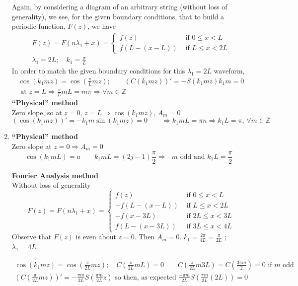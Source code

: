 \documentclass[twoside,10pt]{amsart}
\begin{document}
\begin{enumerate}
Again, by considering a diagram of an arbitrary string (without loss of generality), we see, for the given boundary conditions, that to build a periodic function, $F(z)$, we have
\[
\begin{gathered}
F(z) = F(n\lambda_1 + x) = \begin{cases} f(z) & \text{ if } 0 \leq x < L \\
  f(L- (x-L)) & \text{ if } L \leq x < 2 L 
\end{cases}  \\
\lambda_1 = 2L; \quad  k_1 = \frac{\pi}{L}
\end{gathered}
\]
In order to match the given boundary conditions for this $\lambda_1 = 2L$ waveform,
\[
\begin{gathered}
  \cos{(k_1 mz) } = \cos{ (\frac{\pi}{L} m z ) } ; \quad \quad (C(k_1 m z) )' = -S(k_1 mz) k_1 m = 0 \\
  \text{ at } z = L \Longrightarrow \frac{ \pi }{L} m L  = m \pi \Longrightarrow \forall m \in \mathbb{Z} 
\end{gathered}
\]
\textbf{ ``Physical'' method } \\
Zero slope, so at $z=0, \, z = L \Longrightarrow \cos{ (k_1 m z) }, \, A_m = 0$ \\
\[
(\cos{(k_1 m z)} )' = -k_1 m \sin{ (k_1 mz) } = 0 \quad \quad \Longrightarrow k_1 m L = \pi n \Longrightarrow k_1 L = \pi, \, \forall m \in \mathbb{Z}
\]
  \item 
\textbf{ ``Physical'' method } \\
Zero slope at $z=0  \Longrightarrow A_m = 0 $ \\
\[
\cos{ (k_1 m L ) } = a \quad \quad k_1 m L = (2j-1) \frac{ \pi }{2} \Longrightarrow \text{ $m$ odd  and $k_1 L = \frac{\pi}{2}$ }
\]

\textbf{ Fourier Analysis method } \\
Without loss of generality
\[
F(z) = F(n \lambda_1 + x) = \begin{cases} 
  f(z) & \text{ if } 0 \leq x < L \\
  -f(L-(x-L)) & \text{ if } L \leq x < 2 L \\
  -f(x-3L) & \text{ if } 2L \leq x < 3L \\
  f(L - (x-3L)) & \text{ if } 3L \leq x < 4L 
\end{cases}
\]
Observe that $F(z)$ is even about $z=0$.  Then $A_m = 0$.  $k_1 = \frac{2\pi}{4L} = \frac{\pi}{2L}$ ; \quad $\lambda_1 = 4L$.  

\[
\begin{gathered}
\cos{ (k_1 m z) } = \cos{ \left( \frac{ \pi }{2L} m z \right) }; \quad C\left( \frac{\pi}{2L} mL \right) =  0 \quad \quad C\left( \frac{ \pi}{2L} m 3L \right) = C\left( \frac{ 3\pi m }{2} \right) = 0 \text{ if $m$ odd } \\
\left( C\left( \frac{\pi}{2L} m z \right) \right)' = - \frac{\pi m }{2L} S\left( \frac{ \pi m }{2L} z \right) \text{ so then, as expected } \frac{ - \pi m}{2L } S\left( \frac{ \pi m }{2L} (2L ) \right) = 0 
\end{gathered}
\]
\end{enumerate}
\end{document}
